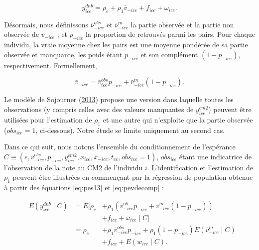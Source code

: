 \documentclass[
]{book}
\begin{document}
\begin{equation}
\label{eq:pes13}
y_{ice}^{dnb} = \rho_e + \rho_1 \bar{v}_{-ice} + f_{ice} + \omega_{ice}.
\end{equation}

Désormais, nous définissons \(\bar{\nu}^{obs}_{-ice}\) et \(\bar{\nu}^m_{-ice}\) la partie observée et la partie non observée de \(\bar{v}_{-ice}\) ; et \(p_{-ice}\) la proportion de retrouvés parmi les pairs. Pour chaque individu, la vraie moyenne chez les pairs est une moyenne pondérée de sa partie observée et manquante, les poids étant \(p_{-ice}\) et son complément \((1 - p_{-ice})\), respectivement. Formellement,

\begin{equation}
\label{eq:pevdecomp}
\bar{v}_{-ice} = \bar{v}^{obs}_{ice} p_{-ice} + \bar{v}^m_{-ice} (1 - p_{-ice}).
\end{equation}

\quad Le modèle de Sojourner (\protect\hyperlink{ref-SOJ:13}{2013}) propose une version dans laquelle toutes les observations (y compris celles avec des valeurs manquantes de \(y^{cm2}_{ice}\)) peuvent être utilisées pour l'estimation de \(\rho_1\) et une autre qui n'exploite que la partie observée (\(obs_{ice} = 1\), ci-dessous). Notre étude se limite uniquement au second cas.

\quad Dans ce qui suit, nous notons l'ensemble du conditionnement de l'espérance \(C \equiv (e, \bar{v}^{obs}_{-ice}, p_{-ice}, y^{cm2}_{ice}, x_{ice}, \bar{x}_{-ice}, t_{ce}, obs_{ice} = 1)\), \(obs_{ice}\) étant une indicatrice de l'observation de la note au CM2 de l'individu \(i\). L'identification et l'estimation de \(\rho_1\) peuvent être illustrées en commençant par la régression de population obtenue à partir des équations \eqref{eq:pes13} et \eqref{eq:pevdecomp} :

\begin{equation}
\label{eq:pes13pop}
\begin{aligned}
&E(y^{dnb}_{ice} \mid C) &= 
E \big[ \rho_e &+ \rho_1 (\bar{v}^{ob}_{-ice} p_{-ice} + \bar{v}^m_{-ice} (1 - p_{-ice})) \\ 
&&&+ f_{ice} + \omega_{ice} \mid C \big] \\
&&= \rho_e &+ \rho_1 \bar{v}^{obs}_{-ice} p_{-ice} + \rho_1 (1 - p_{-ice}) E(\bar{v}^m_{-ice} \mid C) \\
&&&+ f_{ice} + E(w_{ice} \mid C).
\end{aligned}
\end{equation}
\end{document}
